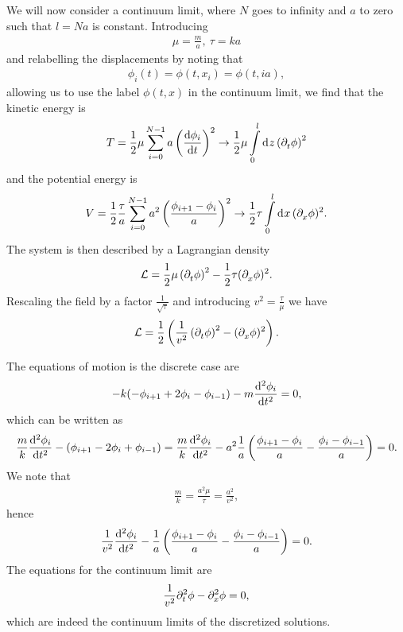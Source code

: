 We will now consider a continuum limit, where $N$ goes to infinity and $a$ to zero such that $l = Na$ is constant. Introducing
\begin{align*}
	\mu = \frac{m}{a},\ \tau = ka
\end{align*}
and relabelling the displacements by noting that
\begin{align*}
	\phi_{i}(t) = \phi(t, x_{i}) = \phi(t, ia),
\end{align*}
allowing us to use the label $\phi(t, x)$ in the continuum limit, we find that the kinetic energy is
\begin{align*}
	T = \frac{1}{2}\mu\sum\limits_{i = 0}^{N - 1}a\left(\dv{\phi_{i}}{t}\right)^{2} \to \frac{1}{2}\mu\int\limits_{0}^{l}\dd[]{z}\left(\partial^{}_{t}{\phi}\right)^{2}
\end{align*}
and the potential energy is
\begin{align*}
	V = \frac{1}{2}\frac{\tau}{a}\sum\limits_{i = 0}^{N - 1}a^{2}\left(\frac{\phi_{i + 1} - \phi_{i}}{a}\right)^{2} \to \frac{1}{2}\tau\int\limits_{0}^{l}\dd[]{x}(\partial^{}_{x}{\phi})^{2}.
\end{align*}
The system is then described by a Lagrangian density
\begin{align*}
	\mathcal{L} = \frac{1}{2}\mu\left(\partial^{}_{t}{\phi}\right)^{2} - \frac{1}{2}\tau(\partial^{}_{x}{\phi})^{2}.
\end{align*}
Rescaling the field by a factor $\frac{1}{\sqrt{\tau}}$ and introducing $v^{2} = \frac{\tau}{\mu}$ we have
\begin{align*}
	\mathcal{L} = \frac{1}{2}\left(\frac{1}{v^{2}}\left(\partial^{}_{t}{\phi}\right)^{2} - (\partial^{}_{x}{\phi})^{2}\right).
\end{align*}

The equations of motion is the discrete case are
\begin{align*}
	-k(-\phi_{i + 1} + 2\phi_{i} - \phi_{i - 1}) - m\dv[2]{\phi_{i}}{t} = 0,
\end{align*}
which can be written as
\begin{align*}
	\frac{m}{k}\dv[2]{\phi_{i}}{t} - \left(\phi_{i + 1} - 2\phi_{i} + \phi_{i - 1}\right) = \frac{m}{k}\dv[2]{\phi_{i}}{t} - a^{2}\frac{1}{a}\left(\frac{\phi_{i + 1} - \phi_{i}}{a} - \frac{\phi_{i} - \phi_{i - 1}}{a}\right) = 0.
\end{align*}
We note that
\begin{align*}
	\frac{m}{k} = \frac{a^{2}\mu}{\tau} = \frac{a^{2}}{v^{2}},
\end{align*}
hence
\begin{align*}
	\frac{1}{v^{2}}\dv[2]{\phi_{i}}{t} - \frac{1}{a}\left(\frac{\phi_{i + 1} - \phi_{i}}{a} - \frac{\phi_{i} - \phi_{i - 1}}{a}\right) = 0.
\end{align*}
The equations for the continuum limit are
\begin{align*}
	\frac{1}{v^{2}}\partial^{2}_{t}{\phi} - \partial^{2}_{x}{\phi} = 0,
\end{align*}
which are indeed the continuum limits of the discretized solutions.

